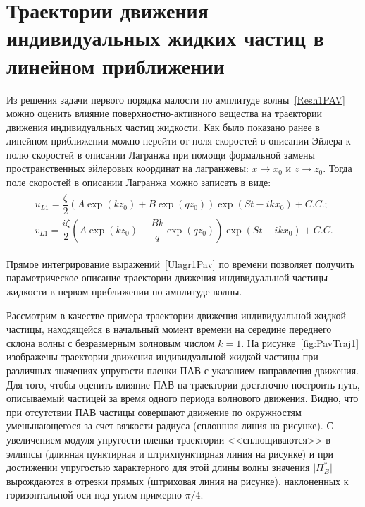\section{Траектории движения индивидуальных жидких частиц в линейном приближении}
Из решения задачи первого порядка малости по амплитуде волны~\eqref{Resh1PAV} можно оценить влияние поверхностно-активного вещества на траектории движения индивидуальных частиц жидкости. Как было показано ранее в линейном приближении можно перейти от поля скоростей в описании Эйлера к полю скоростей в описании Лагранжа при помощи формальной замены пространственных эйлеровых координат на лагранжевы: $ x \rightarrow x_{0} $ и $ z \rightarrow z_{0} $. Тогда поле скоростей в описании Лагранжа можно записать в виде:
\begin{gather}
 \begin{matrix}
u_{L1}=\dfrac{\zeta}{2}\left(A \exp \left( k z_{0} \right) +B \exp \left( q z_{0} \right) \right) \exp \left( S t - i k x_{0} \right) +C.C.;\\
v_{L1}=\dfrac{i \zeta}{2}\left(A \exp \left( k z_{0} \right) +\dfrac{B k}{q}\exp \left( q z_{0} \right) \right) \exp \left( S t - i k x_{0} \right) +C.C.
  \end{matrix}
 \label{Ulagr1Pav}
\end{gather}

Прямое интегрирование выражений~\eqref{Ulagr1Pav} по времени позволяет получить параметрическое описание траектории движения индивидуальной частицы жидкости в первом приближении по амплитуде волны. 

Рассмотрим в качестве примера траектории движения индивидуальной жидкой частицы, находящейся в начальный момент времени на середине переднего склона волны с безразмерным волновым числом $ k=1 $. На рисунке~\ref{fig:PavTraj1} изображены траектории движения индивидуальной жидкой частицы при различных значениях упругости пленки ПАВ с указанием направления движения. Для того, чтобы оценить влияние ПАВ на траектории достаточно построить путь, описываемый частицей за время одного периода волнового движения. Видно, что при отсутствии ПАВ частицы совершают движение по окружностям уменьшающегося за счет вязкости радиуса (сплошная линия на рисунке). С увеличением модуля упругости пленки траектории <<сплющиваются>> в эллипсы (длинная пунктирная и штрихпунктирная линия  на рисунке) и при достижении упругостью характерного для этой длины волны значения $ \vert \Pi_{B}^{*} \vert $ вырождаются в отрезки прямых (штриховая линия на рисунке), наклоненных к горизонтальной оси под углом примерно $ \pi/4 $. 

